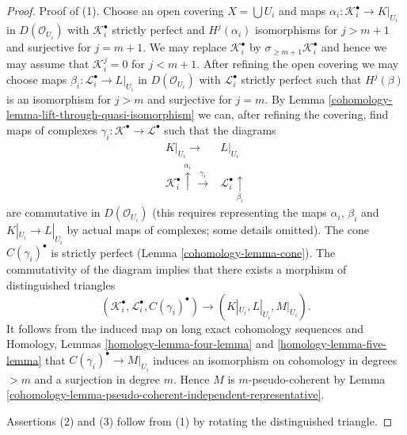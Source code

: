 \begin{proof}

Proof of (1). Choose an open covering $X = \bigcup U_i$ and
maps $\alpha_i : \mathcal{K}_i^\bullet \to K|_{U_i}$ in $D(\mathcal{O}_{U_i})$
with $\mathcal{K}_i^\bullet$ strictly perfect and $H^j(\alpha_i)$
isomorphisms for $j > m + 1$ and surjective for $j = m + 1$.
We may replace $\mathcal{K}_i^\bullet$ by
$\sigma_{\geq m + 1}\mathcal{K}_i^\bullet$
and hence we may assume that $\mathcal{K}_i^j = 0$
for $j < m + 1$. After refining the open covering we may choose
maps $\beta_i : \mathcal{L}_i^\bullet \to L|_{U_i}$ in $D(\mathcal{O}_{U_i})$
with $\mathcal{L}_i^\bullet$ strictly perfect such that
$H^j(\beta)$ is an isomorphism for $j > m$ and
surjective for $j = m$. By
Lemma \ref{cohomology-lemma-lift-through-quasi-isomorphism}
we can, after refining the covering, find maps of complexes
$\gamma_i : \mathcal{K}^\bullet \to \mathcal{L}^\bullet$
such that the diagrams
$$
\begin{array}{cc}K|_{U_i} \longrightarrow & L|_{U_i} \\ \mathcal{K}_i^\bullet \overset{\alpha_i}{\uparrow}\overset{\gamma_i}{\longrightarrow} & \mathcal{L}_i^\bullet \underset{\beta_i}{\uparrow}\end{array}
$$
are commutative in $D(\mathcal{O}_{U_i})$ (this requires representing the
maps $\alpha_i$, $\beta_i$ and $K|_{U_i} \to L|_{U_i}$
by actual maps of complexes; some details omitted).
The cone $C(\gamma_i)^\bullet$ is strictly perfect (Lemma \ref{cohomology-lemma-cone}).
The commutativity of the diagram implies that there exists a morphism
of distinguished triangles
$$
(\mathcal{K}_i^\bullet, \mathcal{L}_i^\bullet, C(\gamma_i)^\bullet)
\longrightarrow
(K|_{U_i}, L|_{U_i}, M|_{U_i}).
$$
It follows from the induced map on long exact cohomology sequences and
Homology, Lemmas \ref{homology-lemma-four-lemma} and
\ref{homology-lemma-five-lemma}
that $C(\gamma_i)^\bullet \to M|_{U_i}$ induces an isomorphism
on cohomology in degrees $> m$ and a surjection in degree $m$.
Hence $M$ is $m$-pseudo-coherent by
Lemma \ref{cohomology-lemma-pseudo-coherent-independent-representative}.

\medskip\noindent
Assertions (2) and (3) follow from (1) by rotating the distinguished
triangle.
\end{proof}

